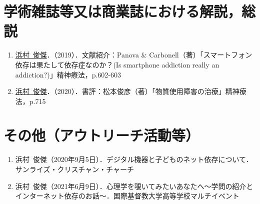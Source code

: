 \documentclass[11pt,a4paper]{article}
\begin{document}
\section{学術雑誌等又は商業誌における解説，総説}
\begin{enumerate}
	\item \underline{浜村\ 俊傑}．（2019）．文献紹介：Panova \& Carbonell（著）「スマートフォン依存は果たして依存症なのか？(Is smartphone addiction really an addiction?)」精神療法，p.602-603
	\item \underline{浜村\ 俊傑}．（2020）．書評：松本俊彦（著）「物質使用障害の治療」精神療法，p.715
\end{enumerate}

\section{その他（アウトリーチ活動等）}
\begin{enumerate}
	\item 浜村\ 俊傑（2020年9月5日）．デジタル機器と子どものネット依存について．サンライズ・クリスチャン・チャーチ
	\item 浜村\ 俊傑（2021年6月9日）．心理学を覗いてみたいあなたへ〜学問の紹介とインターネット依存のお話〜．国際基督教大学高等学校マルチイベント
\end{enumerate}
\end{document}
